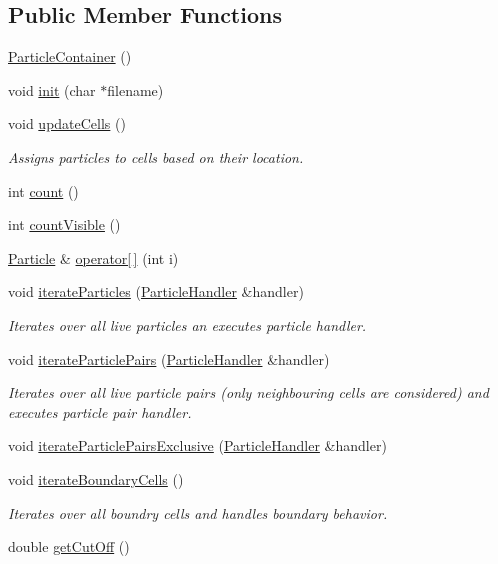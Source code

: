 \subsection*{Public Member Functions}
\begin{DoxyCompactItemize}
\item 
\hyperlink{classSimulation_1_1ParticleContainer_a76d21bdb5141158cf664d65e2d8b1db7}{Particle\-Container} ()
\item 
void \hyperlink{classSimulation_1_1ParticleContainer_a2bdf40eb2fab6e85afddf69d6ef43f27}{init} (char $\ast$filename)
\item 
void \hyperlink{classSimulation_1_1ParticleContainer_af3b7b2d3c26a67a390857a8aa0c8b31b}{update\-Cells} ()
\begin{DoxyCompactList}\small\item\em Assigns particles to cells based on their location. \end{DoxyCompactList}\item 
int \hyperlink{classSimulation_1_1ParticleContainer_a8a7a0979f6d714977491fe14529004ee}{count} ()
\item 
int \hyperlink{classSimulation_1_1ParticleContainer_a5d3d7a52a8a5fe0db99e6e424c83d3bf}{count\-Visible} ()
\item 
\hyperlink{classSimulation_1_1Particle}{Particle} \& \hyperlink{classSimulation_1_1ParticleContainer_a691b50db5c7d2fce6d2576c0b51b4ea9}{operator\mbox{[}$\,$\mbox{]}} (int i)
\item 
void \hyperlink{classSimulation_1_1ParticleContainer_a13b3ada63172c5070e81235bc16801ca}{iterate\-Particles} (\hyperlink{classSimulation_1_1ParticleHandler}{Particle\-Handler} \&handler)
\begin{DoxyCompactList}\small\item\em Iterates over all live particles an executes particle handler. \end{DoxyCompactList}\item 
void \hyperlink{classSimulation_1_1ParticleContainer_a2d7f15f3d5cb18cd08dadc8f01f2e04a}{iterate\-Particle\-Pairs} (\hyperlink{classSimulation_1_1ParticleHandler}{Particle\-Handler} \&handler)
\begin{DoxyCompactList}\small\item\em Iterates over all live particle pairs (only neighbouring cells are considered) and executes particle pair handler. \end{DoxyCompactList}\item 
void \hyperlink{classSimulation_1_1ParticleContainer_ab70a9d544a8428d7085863990bca1811}{iterate\-Particle\-Pairs\-Exclusive} (\hyperlink{classSimulation_1_1ParticleHandler}{Particle\-Handler} \&handler)
\item 
void \hyperlink{classSimulation_1_1ParticleContainer_a4ecf8c0f85e656bbfbe36b883c5e5e23}{iterate\-Boundary\-Cells} ()
\begin{DoxyCompactList}\small\item\em Iterates over all boundry cells and handles boundary behavior. \end{DoxyCompactList}\item 
double \hyperlink{classSimulation_1_1ParticleContainer_a81e96b1c9c1466650af5c5a0b2fb5652}{get\-Cut\-Off} ()
\end{DoxyCompactItemize}

